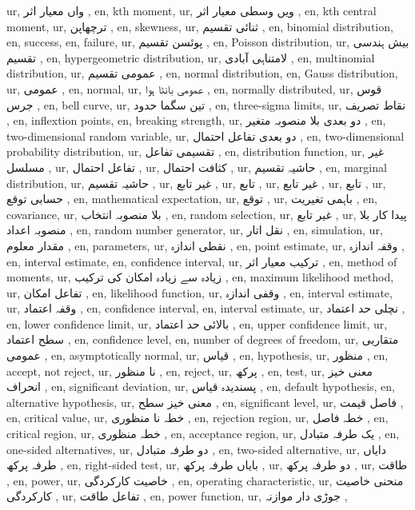 ur,  واں معیار اثر ,
en, kth moment,
ur,  ویں وسطی معیار اثر ,
en, kth central moment,
ur, ترچھاپن ,
en, skewness,
ur, ثنائی تقسیم ,
en, binomial distribution,
en, success,
en, failure,
ur, پوئسن تقسیم ,
en, Poisson distribution,
ur, بیش ہندسی تقسیم ,
en, hypergeometric distribution,
ur, لامتناہی آبادی ,
en, multinomial distribution,
ur, عمومی تقسیم ,
en, normal distribution,
en, Gauss distribution,
ur, عمومی ,
en, normal,
ur, عمومی بانٹا ہوا ,
en, normally distributed,
ur, قوس جرس ,
en, bell curve,
ur, تین سگما حدود ,
en, three-sigma limits,
ur, نقاط تصریف ,
en, inflextion points,
en, breaking strength,
ur, دو بعدی بلا منصوبہ متغیر ,
en, two-dimensional random variable,
ur, دو بعدی تفاعل احتمال ,
en, two-dimensional probability distribution,
ur, تقسیمی تفاعل ,
en, distribution function,
ur, غیر مسلسل ,
ur, تفاعل احتمال ,
ur, کثافت احتمال ,
ur, حاشیہ تقسیم ,
en, marginal distribution,
ur, حاشیہ تقسیم ,
ur, غیر تابع ,
ur, تابع ,
ur, غیر تابع ,
ur, تابع ,
ur, حسابی توقع ,
en, mathematical expectation,
ur, توقع ,
ur, باہمی تغیریت ,
en, covariance,
ur, بلا منصوبہ انتخاب ,
en, random selection,
ur, غیر تابع ,
ur, پیدا کار بلا منصوبہ اعداد ,
en, random number generator,
ur, نقل اتار ,
en, simulation,
ur, مقدار معلوم ,
en, parameters,
ur, نقطی اندازہ ,
en, point estimate,
ur, وقفہ اندازہ ,
en, interval estimate,
en, confidence interval,
ur, ترکیب معیار اثر ,
en, method of moments,
ur, زیادہ سے زیادہ امکان کی ترکیب ,
en, maximum likelihood method,
ur, تفاعل امکان ,
en, likelihood function,
ur, وقفی اندازہ ,
en, interval estimate,
ur, وقفہ اعتماد ,
en, confidence interval,
en, interval estimate,
ur, نچلی حد اعتماد ,
en, lower confidence limit,
ur, بالائی حد اعتماد ,
en, upper confidence limit,
ur, سطح اعتماد ,
en, confidence level,
en, number of degrees of freedom,
ur, متقاربی عمومی ,
en, asymptotically normal,
ur, قیاس ,
en, hypothesis,
ur, منظور ,
en, accept, not reject,
ur, نا منظور ,
en, reject,
ur, پرکھ ,
en, test,
ur, معنی خیز انحراف ,
en, significant deviation,
ur, پسندیدہ قیاس ,
en, default hypothesis,
en, alternative hypothesis,
ur, معنی خیز سطح ,
en, significant level,
ur, فاصل قیمت ,
en, critical value,
ur, خطہ نا منظوری ,
en, rejection region,
ur, خطہ فاصل ,
en, critical region,
ur, خطہ منظوری ,
en, acceptance region,
ur, یک طرفہ متبادل ,
en, one-sided alternatives,
ur, دو طرفہ متبادل ,
en, two-sided alternative,
ur, دایاں طرفہ پرکھ ,
en, right-sided test,
ur, بایاں طرفہ پرکھ ,
ur, دو طرفہ پرکھ ,
ur, طاقت ,
en, power,
ur, خاصیت کارکردگی ,
en, operating characteristic,
ur, منحنی خاصیت کارکردگی ,
ur, تفاعل طاقت ,
en, power function,
ur, جوڑی دار موازنہ ,

